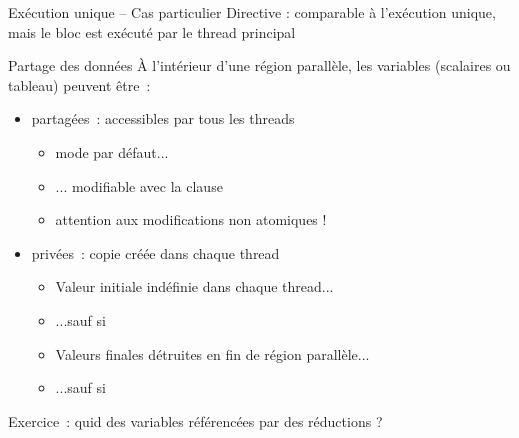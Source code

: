\begin {frame} {Exécution unique -- Cas particulier}
    Directive  : comparable à
    l'exécution unique, mais le bloc est exécuté par le thread
    principal

\end {frame}





\begin {frame} {Partage des données}
    À l'intérieur d'une région parallèle, les variables (scalaires
    ou tableau) peuvent être~:

    \begin {itemize}
	\item partagées~: accessibles par tous les threads


	    \begin {itemize}
		\item mode par défaut...
		\item ... modifiable avec la clause 
		\item attention aux modifications non atomiques !
	    \end {itemize}

	\item privées~: copie créée dans chaque thread


	    \begin {itemize}
		\item Valeur initiale indéfinie dans chaque thread...
		\item ...sauf si 
		\item Valeurs finales détruites en fin de région
		    parallèle...
		\item ...sauf si 
	    \end {itemize}
    \end {itemize}

    Exercice~: quid des variables référencées par des réductions ?
\end {frame}

